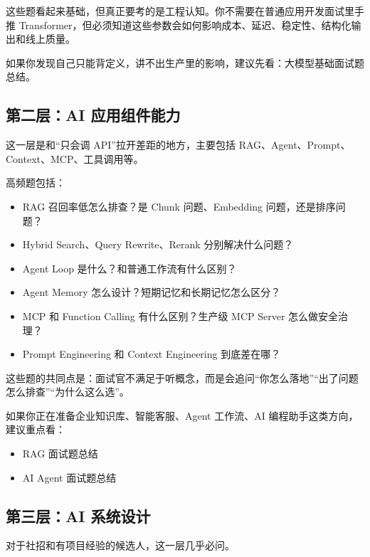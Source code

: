 \documentclass[10pt,a4paper]{ctexart}
\begin{document}
这些题看起来基础，但真正要考的是工程认知。你不需要在普通应用开发面试里手推 Transformer，但必须知道这些参数会如何影响成本、延迟、稳定性、结构化输出和线上质量。



如果你发现自己只能背定义，讲不出生产里的影响，建议先看：大模型基础面试题总结。



\subsection{第二层：AI 应用组件能力}


这一层是和“只会调 API”拉开差距的地方，主要包括 RAG、Agent、Prompt、Context、MCP、工具调用等。



高频题包括：


\begin{itemize}[itemsep=2pt, topsep=4pt]
  \item RAG 召回率低怎么排查？是 Chunk 问题、Embedding 问题，还是排序问题？
  \item Hybrid Search、Query Rewrite、Rerank 分别解决什么问题？
  \item Agent Loop 是什么？和普通工作流有什么区别？
  \item Agent Memory 怎么设计？短期记忆和长期记忆怎么区分？
  \item MCP 和 Function Calling 有什么区别？生产级 MCP Server 怎么做安全治理？
  \item Prompt Engineering 和 Context Engineering 到底差在哪？
\end{itemize}


这些题的共同点是：面试官不满足于听概念，而是会追问“你怎么落地”“出了问题怎么排查”“为什么这么选”。



如果你正在准备企业知识库、智能客服、Agent 工作流、AI 编程助手这类方向，建议重点看：


\begin{itemize}[itemsep=2pt, topsep=4pt]
  \item RAG 面试题总结
  \item AI Agent 面试题总结
\end{itemize}


\subsection{第三层：AI 系统设计}


对于社招和有项目经验的候选人，这一层几乎必问。
\end{document}
